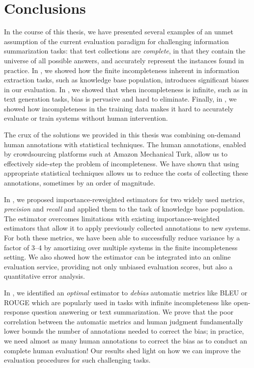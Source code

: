 \chapter[Conclusions]{\label{chap:discussion} Conclusions}

In the course of this thesis, we have presented several examples of an unmet assumption of the current evaluation paradigm for challenging information summarization tasks: that test collections are \textit{complete}, in that they contain the universe of all possible answers, and accurately represent the instances found in practice.
In , we showed how the finite incompleteness inherent in information extraction tasks, such as knowledge base population, introduces significant biases in our evaluation.
In , we showed that when incompleteness is infinite, such as in text generation tasks, bias is pervasive and hard to eliminate.
Finally, in , we showed how incompleteness in the training data makes it hard to accurately evaluate or train systems without human intervention.

The crux of the solutions we provided in this thesis was combining on-demand human annotations with statistical techniques.
The human annotations, enabled by crowdsourcing platforms such at Amazon Mechanical Turk, allow us to effectively side-step the problem of incompleteness.
We have shown that using appropriate statistical techniques allows us to reduce the costs of collecting these annotations, sometimes by an order of magnitude.

In , we proposed importance-reweighted estimators for two widely used metrics, \textit{precision} and \textit{recall} and applied them to the task of knowledge base population.
The estimator overcomes limitations with existing importance-weighted estimators that allow it to apply previously collected annotations to new systems.
For both these metrics, we have been able to successfully reduce variance by a factor of 3--4 by amortizing over multiple systems in the finite incompleteness setting.
We also showed how the estimator can be integrated into an online evaluation service, providing not only unbiased evaluation scores, but also a quantitative error analysis.

In , we identified an \textit{optimal} estimator to \textit{debias} automatic metrics like BLEU or ROUGE which are popularly used in tasks with infinite incompleteness like open-response question answering or text summarization.
We prove that the poor correlation between the automatic metrics and human judgment fundamentally lower bounds the number of annotations needed to correct the bias;
  in practice, we need almost as many human annotations to correct the bias as to conduct an complete human evaluation!
Our results shed light on how we can improve the evaluation procedures for such challenging tasks.

